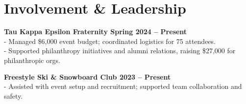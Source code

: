 \documentclass[11pt, letterpaper]{article}
\begin{document}
\section*{Involvement \& Leadership}
\textbf{Tau Kappa Epsilon Fraternity \hfill Spring 2024 – Present} \\
- Managed \$6,000 event budget; coordinated logistics for 75 attendees. \\
- Supported philanthropy initiatives and alumni relations, raising \$27,000 for philanthropic orgs.

\textbf{Freestyle Ski \& Snowboard Club \hfill 2023 – Present} \\
- Assisted with event setup and recruitment; supported team collaboration and safety.
\end{document}
